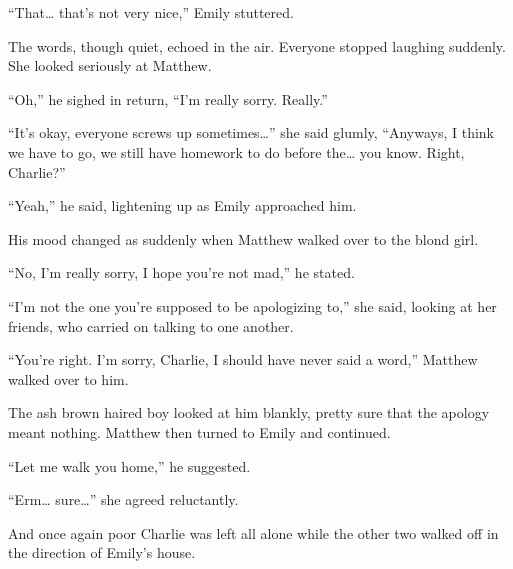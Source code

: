 “That… that's not very nice,” Emily stuttered.

The words, though quiet, echoed in the air. Everyone stopped laughing suddenly. She looked seriously at Matthew.

“Oh,” he sighed in return, “I'm really sorry. Really.”

“It's okay, everyone screws up sometimes…” she said glumly, “Anyways, I think we have to go, we still have homework to do before the… you know. Right, Charlie?”

“Yeah,” he said, lightening up as Emily approached him.

His mood changed as suddenly when Matthew walked over to the blond girl.

“No, I'm really sorry, I hope you're not mad,” he stated.

“I'm not the one you're supposed to be apologizing to,” she said, looking at her friends, who carried on talking to one another.

“You're right. I'm sorry, Charlie, I should have never said a word,” Matthew walked over to him.

The ash brown haired boy looked at him blankly, pretty sure that the apology meant nothing. Matthew then turned to Emily and continued.

“Let me walk you home,” he suggested.

“Erm… sure…” she agreed reluctantly.

And once again poor Charlie was left all alone while the other two walked off in the direction of Emily's house.